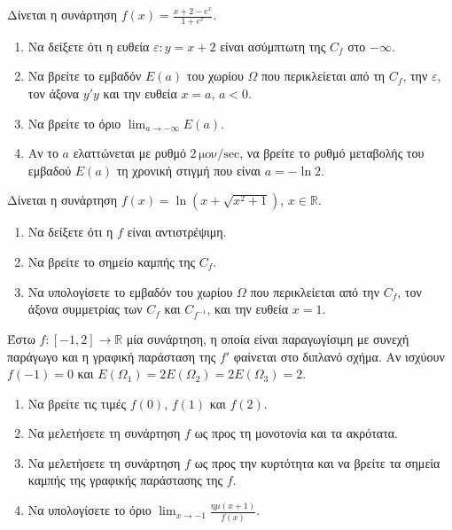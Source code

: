 \documentclass{presentation}
\begin{document}
\begin{askisi}
  Δίνεται η συνάρτηση $f(x) = \frac{x+2-e^x}{1+e^x}$.
  \begin{enumerate}[<+->]
    \item Να δείξετε ότι η ευθεία $ε: y = x+2$ είναι ασύμπτωτη της $C_f$ στο $-\infty$.
    \item Να βρείτε το εμβαδόν $E(a)$ του χωρίου $Ω$ που περικλείεται από τη $C_f$, την $ε$, τον άξονα $y'y$ και την ευθεία $x=a$, $a<0$.
    \item Να βρείτε το όριο $\lim_{a \to -\infty} E(a)$.
    \item Αν το $a$ ελαττώνεται με ρυθμό $2 \, \text{μον}/\text{sec}$, να βρείτε το ρυθμό μεταβολής του εμβαδού $E(a)$ τη χρονική στιγμή που είναι $a = -\ln 2$.
  \end{enumerate}
\end{askisi}

\begin{askisi}
  Δίνεται η συνάρτηση $f(x) = \ln(x+\sqrt{x^2+1})$, $x \in \mathbb{R}$.
  \begin{enumerate}[<+->]
    \item Να δείξετε ότι η $f$ είναι αντιστρέψιμη.
    \item Να βρείτε το σημείο καμπής της $C_f$.
    \item Να υπολογίσετε το εμβαδόν του χωρίου $Ω$ που περικλείεται από την $C_f$, τον άξονα συμμετρίας των $C_f$ και $C_{f^{-1}}$, και την ευθεία $x=1$.
  \end{enumerate}
\end{askisi}

\begin{askisi}
  Έστω $f:[-1,2] \to \mathbb{R}$ μία συνάρτηση, η οποία είναι παραγωγίσιμη με συνεχή παράγωγο και η γραφική παράσταση της $f'$ φαίνεται στο διπλανό σχήμα. Αν ισχύουν $f(-1)=0$ και $E(Ω_1) = 2E(Ω_2) = 2E(Ω_3) = 2$.
  \begin{enumerate}[<+->]
    \item Να βρείτε τις τιμές $f(0)$, $f(1)$ και $f(2)$.
    \item Να μελετήσετε τη συνάρτηση $f$ ως προς τη μονοτονία και τα ακρότατα.
    \item Να μελετήσετε τη συνάρτηση $f$ ως προς την κυρτότητα και να βρείτε τα σημεία καμπής της γραφικής παράστασης της $f$.
    \item Να υπολογίσετε το όριο $\lim_{x \to -1} \frac{ημ(x+1)}{f(x)}$.
  \end{enumerate}
\end{askisi}

\moodle
\end{document}
